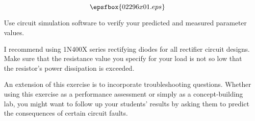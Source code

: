 

$$\epsfbox{02296x01.eps}$$

\vfil \eject






Use circuit simulation software to verify your predicted and measured parameter values.







I recommend using 1N400X series rectifying diodes for all rectifier circuit designs.  Make sure that the resistance value you specify for your load is not so low that the resistor's power dissipation is exceeded.  

An extension of this exercise is to incorporate troubleshooting questions.  Whether using this exercise as a performance assessment or simply as a concept-building lab, you might want to follow up your students' results by asking them to predict the consequences of certain circuit faults.




